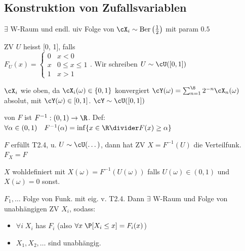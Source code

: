 \subsection{Konstruktion von Zufallsvariablen}
 $\exists$ W-Raum und endl. uiv Folge von $\cX_i \sim \text{Ber}\left( \frac{1}{2} \right)$ mit param $0.5$

\shortdefinition ZV $U$ heisst  [0, 1], falls\\
$F_U(x) = \begin{cases}
        0 & x < 0           \\
        x & 0 \leq x \leq 1 \\
        1 & x > 1
    \end{cases}$.
Wir schreiben $U \sim \cU([0, 1])$

\shorttheorem $\cX_i$ wie oben, da $\cX_i(\omega) \in \{ 0, 1 \}$ konvergiert
$\cY(\omega) = \sum_{n = 1}^{\8} 2^{-n} \cX_n (\omega)$ absolut, mit $\cY(\omega) \in [0, 1]$.
$\cY \sim \cU([0, 1])$

 von $F$ ist $F^{-1} : (0, 1) \rightarrow \R$. Def:\\
$\forall \alpha \in (0, 1) \quad F^{-1} (\alpha) = \inf\{ x \in \R \divider F(x) \geq \alpha \}$

\shorttheorem[Inversionsmethode] $F$ erfüllt T2.4, u. $U \sim \cU(\dots)$, dann hat ZV $X = F^{-1}(U)$ die Verteilfunk. $F_X = F$

\shortremark $X$ wohldefiniert mit $X(\omega) = F^{-1}(U(\omega))$ falls $U(\omega) \in (0, 1)$ und $X(\omega) = 0$ sonst.

\shorttheorem $F_1, \ldots$ Folge von Funk. mit eig. v. T2.4. Dann $\exists$ W-Raum und Folge von unabhängigen ZV $X_i$, sodass:
\begin{itemize}
    \item $\forall i \; X_i$ has $F_i$ (also $\forall x\; \P[X_i \leq x] = F_i(x)$)
    \item $X_1, X_2, \ldots$ sind unabhängig.
\end{itemize}
